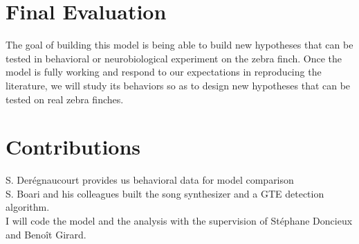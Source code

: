 \documentclass[a4paper]{article}
\begin{document}
\section*{Final Evaluation}

The goal of building this model is being able to build new hypotheses that can
be tested in behavioral or neurobiological experiment on the zebra finch. Once
the model is fully working and respond to our expectations in reproducing the
literature, we will study its behaviors so as to design new hypotheses that can
be tested on real zebra finches.

\section*{Contributions}
S. Derégnaucourt provides us behavioral data for model comparison\\
S. Boari and his colleagues built the song synthesizer and a GTE detection
algorithm.\\
I will code the model and the analysis with the supervision of Stéphane Doncieux
and Benoît Girard.\\

\clearpage%
\printbibliography{}
\end{document}
